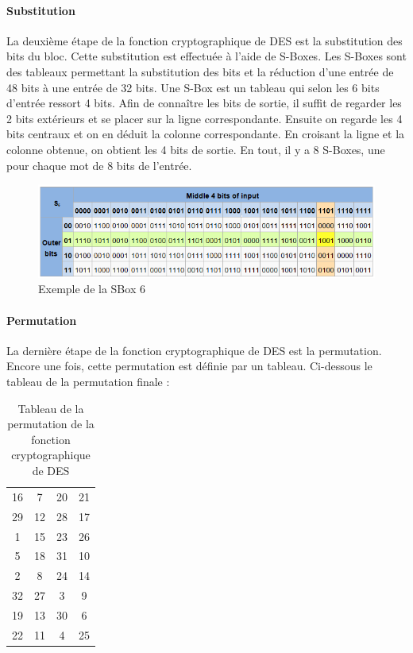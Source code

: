 \documentclass[a4paper]{article}
\begin{document}
\smallbreak
\newpage

\paragraph{Substitution}
La deuxième étape de la fonction cryptographique de DES est la substitution des bits du bloc. Cette substitution est effectuée à l'aide de S-Boxes. Les S-Boxes sont des tableaux permettant la substitution des bits et la réduction d'une entrée de 48 bits à une entrée de 32 bits.
\smallbreak
Une S-Box est un tableau qui selon les 6 bits d'entrée ressort 4 bits. Afin de connaître les bits de sortie, il suffit de regarder les 2 bits extérieurs et se placer sur la ligne correspondante. Ensuite on regarde les 4 bits centraux et on en déduit la colonne correspondante. En croisant la ligne et la colonne obtenue, on obtient les 4 bits de sortie. En tout, il y a 8 S-Boxes, une pour chaque mot de 8 bits de l'entrée.

\begin{figure}[h]
\begin{center}
\includegraphics[width=\textwidth]{images/SBox6.png} 
\caption{Exemple de la SBox 6}
\end{center}
\end{figure}

\paragraph{Permutation}
La dernière étape de la fonction cryptographique de DES est la permutation. Encore une fois, cette permutation est définie par un tableau. Ci-dessous le tableau de la permutation finale :
\begin{table}[h]
\centering
\begin{tabular}{|cccc|}
  \hline
  16 & 7 & 20 & 21 \\
  29 & 12 & 28 & 17 \\
  1 & 15 & 23 & 26 \\
  5 & 18 & 31 & 10 \\
  2 & 8 & 24 & 14 \\
  32 & 27 & 3 & 9 \\
  19 & 13 & 30 & 6 \\
  22 & 11 & 4 & 25 \\
  \hline
\end{tabular}
\caption{Tableau de la permutation de la fonction cryptographique de DES}
\end{table}
\end{document}
